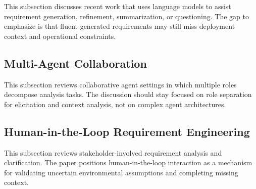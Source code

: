 This subsection discusses recent work that uses language models to assist requirement generation, refinement, summarization, or questioning.
The gap to emphasize is that fluent generated requirements may still miss deployment context and operational constraints.

\subsection{Multi-Agent Collaboration}
\label{rw:multi_agent}

This subsection reviews collaborative agent settings in which multiple roles decompose analysis tasks.
The discussion should stay focused on role separation for elicitation and context analysis, not on complex agent architectures.

\subsection{Human-in-the-Loop Requirement Engineering}
\label{rw:hitl}

This subsection reviews stakeholder-involved requirement analysis and clarification.
The paper positions human-in-the-loop interaction as a mechanism for validating uncertain environmental assumptions and completing missing context.
